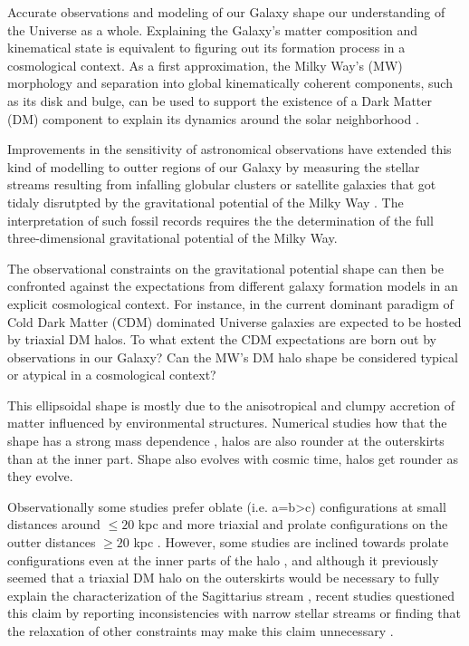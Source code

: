 \documentclass[a4paper,fleqn,usenatbib]{mnras}
\begin{document}
Accurate observations and modeling of our Galaxy 
shape our understanding of the Universe as a whole.  
Explaining the Galaxy's matter composition and kinematical state is 
equivalent to figuring out its formation process in a cosmological
context. 
As a first approximation, the Milky Way's (MW) morphology and
separation into global kinematically coherent components, such as its
disk and bulge, can be used to support the  existence of a Dark Matter
(DM) component to explain its dynamics around the solar neighborhood
\citep{2000MNRAS.311..361O,2009PASJ...61..227S,2010JCAP...08..004C,2013ApJ...779..115B,Iocco15}.  

Improvements in the sensitivity of astronomical observations have 
extended this kind of modelling to outter regions of our Galaxy by measuring
the stellar streams resulting from infalling globular clusters or
satellite galaxies that got tidaly disrutpted by the gravitational
potential of the Milky Way
\citep{1998ApJ...495..297J,1999MNRAS.307..495H, 1999MNRAS.307..877T}. 
The interpretation of such fossil records requires the the
determination of the full three-dimensional gravitational potential of
the Milky  Way.

The observational constraints on the gravitational potential shape can then
be confronted against the expectations from different galaxy formation
models in an explicit cosmological context.
For instance, in the current dominant paradigm of Cold Dark Matter
(CDM) dominated Universe galaxies are expected to be hosted by
triaxial DM halos. To what extent the CDM expectations are born out by
observations in our Galaxy? Can the MW's DM halo shape be considered
typical or atypical in a cosmological context?

This ellipsoidal shape is mostly due to the anisotropical and
clumpy accretion of matter influenced by environmental structures.
Numerical studies how that the shape has a strong mass dependence
\citep{Allgood_et_al._2006}, halos are also rounder at the outerskirts
than at the inner part. 
Shape also evolves with cosmic time, halos get
rounder as they evolve.  


\citep{Dubinski91}


Observationally some studies prefer oblate (i.e. a=b>c) configurations at small
distances around $\leq 20$ kpc
\citep[see][]{Law_and_Majewski_2010,Bovy_et_el._2016,Loebman_et_al._2012,Olling_and_Merrifield_2000,Banerjee_and_Chanda_2011} 
and more triaxial and prolate configurations on the outter distances
$\geq 20$ kpc 
\citep[see][]{Vera-Ciro_and_Helmi_2013,Law_and_Majewski_2009,Deg_and_Widrow_2013,Banerjee_and_Chanda_2011}.
However, some  studies are inclined towards prolate configurations even at the inner
parts of the halo \citep[see][]{Bowden_et_al._2016}, and
although it previously seemed that a triaxial DM halo on the
outerskirts would be necessary to fully explain the characterization
of the Sagittarius stream \citep{Law_and_Majewski_2009}, recent studies
questioned this claim by reporting inconsistencies with narrow stellar
streams \citet{Pearson_et_al._2015} or finding that
the relaxation of other constraints may make this claim unnecessary
\citet{Ibata_et_al._2013}. 
\end{document}
